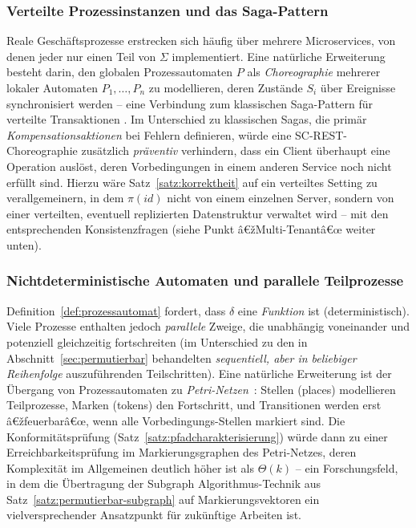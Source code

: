 ﻿\documentclass[a4paper,12pt]{article}
\theoremstyle{definition}
\begin{document}
\subsubsection{Verteilte Prozessinstanzen und das Saga-Pattern}

Reale Geschäftsprozesse erstrecken sich häufig über mehrere Microservices, von denen jeder
nur einen Teil von $\Sigma$ implementiert. Eine natürliche Erweiterung besteht darin, den
globalen Prozessautomaten $P$ als \emph{Choreographie} mehrerer lokaler Automaten
$P_1,\ldots,P_n$ zu modellieren, deren Zustände $S_i$ über Ereignisse synchronisiert
werden -- eine Verbindung zum klassischen Saga-Pattern für verteilte Transaktionen
\cite{garcia1987}. Im Unterschied zu klassischen Sagas, die primär
\emph{Kompensationsaktionen} bei Fehlern definieren, würde eine SC-REST-Choreographie
zusätzlich \emph{präventiv} verhindern, dass ein Client überhaupt eine Operation auslöst,
deren Vorbedingungen in einem anderen Service noch nicht erfüllt sind. Hierzu wäre
Satz~\ref{satz:korrektheit} auf ein verteiltes Setting zu verallgemeinern, in dem $\pi(id)$
nicht von einem einzelnen Server, sondern von einer verteilten, eventuell replizierten
Datenstruktur verwaltet wird -- mit den entsprechenden Konsistenzfragen (siehe Punkt
â€žMulti-Tenantâ€œ weiter unten).

\subsubsection{Nichtdeterministische Automaten und parallele Teilprozesse}

Definition~\ref{def:prozessautomat} fordert, dass $\delta$ eine \emph{Funktion} ist
(deterministisch). Viele Prozesse enthalten jedoch \emph{parallele} Zweige, die
unabhängig voneinander und potenziell gleichzeitig fortschreiten (im Unterschied zu den in
Abschnitt~\ref{sec:permutierbar} behandelten \emph{sequentiell, aber in beliebiger
Reihenfolge} auszuführenden Teilschritten). Eine natürliche Erweiterung ist der Übergang
von Prozessautomaten zu \emph{Petri-Netzen}~\cite{murata1989}: Stellen (places)
modellieren Teilprozesse, Marken (tokens) den Fortschritt, und Transitionen werden erst
â€žfeuerbarâ€œ, wenn alle Vorbedingungs-Stellen markiert sind. Die Konformitätsprüfung
(Satz~\ref{satz:pfadcharakterisierung}) würde dann zu einer Erreichbarkeitsprüfung im
Markierungsgraphen des Petri-Netzes, deren Komplexität im Allgemeinen deutlich höher ist
als $\Theta(k)$ -- ein Forschungsfeld, in dem die Übertragung der
Subgraph Algorithmus-Technik aus Satz~\ref{satz:permutierbar-subgraph} auf
Markierungsvektoren ein vielversprechender Ansatzpunkt für zukünftige Arbeiten ist.
\end{document}
